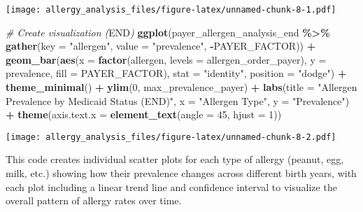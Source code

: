 \documentclass[
]{article}
\newenvironment{Shaded}{\begin{snugshade}}{\end{snugshade}}
\newcommand{\AttributeTok}[1]{\textcolor[rgb]{0.13,0.29,0.53}{#1}}
\newcommand{\CommentTok}[1]{\textcolor[rgb]{0.56,0.35,0.01}{\textit{#1}}}
\newcommand{\DecValTok}[1]{\textcolor[rgb]{0.00,0.00,0.81}{#1}}
\newcommand{\FunctionTok}[1]{\textcolor[rgb]{0.13,0.29,0.53}{\textbf{#1}}}
\newcommand{\NormalTok}[1]{#1}
\newcommand{\RegionMarkerTok}[1]{#1}
\newcommand{\SpecialCharTok}[1]{\textcolor[rgb]{0.81,0.36,0.00}{\textbf{#1}}}
\newcommand{\StringTok}[1]{\textcolor[rgb]{0.31,0.60,0.02}{#1}}
\begin{document}
\texttt{[image: allergy\_analysis\_files/figure-latex/unnamed-chunk-8-1.pdf]}

\begin{Shaded}
\begin{Highlighting}[]
\CommentTok{\# Create visualization (}\RegionMarkerTok{END}\CommentTok{)}
\FunctionTok{ggplot}\NormalTok{(payer\_allergen\_analysis\_end }\SpecialCharTok{\%\textgreater{}\%} 
       \FunctionTok{gather}\NormalTok{(}\AttributeTok{key =} \StringTok{"allergen"}\NormalTok{, }\AttributeTok{value =} \StringTok{"prevalence"}\NormalTok{, }\SpecialCharTok{{-}}\NormalTok{PAYER\_FACTOR)) }\SpecialCharTok{+}
  \FunctionTok{geom\_bar}\NormalTok{(}\FunctionTok{aes}\NormalTok{(}\AttributeTok{x =} \FunctionTok{factor}\NormalTok{(allergen, }\AttributeTok{levels =}\NormalTok{ allergen\_order\_payer), }
               \AttributeTok{y =}\NormalTok{ prevalence, }\AttributeTok{fill =}\NormalTok{ PAYER\_FACTOR), }
           \AttributeTok{stat =} \StringTok{"identity"}\NormalTok{, }\AttributeTok{position =} \StringTok{"dodge"}\NormalTok{) }\SpecialCharTok{+}
  \FunctionTok{theme\_minimal}\NormalTok{() }\SpecialCharTok{+}
  \FunctionTok{ylim}\NormalTok{(}\DecValTok{0}\NormalTok{, max\_prevalence\_payer) }\SpecialCharTok{+}
  \FunctionTok{labs}\NormalTok{(}\AttributeTok{title =} \StringTok{"Allergen Prevalence by Medicaid Status (END)"}\NormalTok{,}
       \AttributeTok{x =} \StringTok{"Allergen Type"}\NormalTok{,}
       \AttributeTok{y =} \StringTok{"Prevalence"}\NormalTok{) }\SpecialCharTok{+}
  \FunctionTok{theme}\NormalTok{(}\AttributeTok{axis.text.x =} \FunctionTok{element\_text}\NormalTok{(}\AttributeTok{angle =} \DecValTok{45}\NormalTok{, }\AttributeTok{hjust =} \DecValTok{1}\NormalTok{))}
\end{Highlighting}
\end{Shaded}

\texttt{[image: allergy\_analysis\_files/figure-latex/unnamed-chunk-8-2.pdf]}

This code creates individual scatter plots for each type of allergy
(peanut, egg, milk, etc.) showing how their prevalence changes across
different birth years, with each plot including a linear trend line and
confidence interval to visualize the overall pattern of allergy rates
over time.
\end{document}
